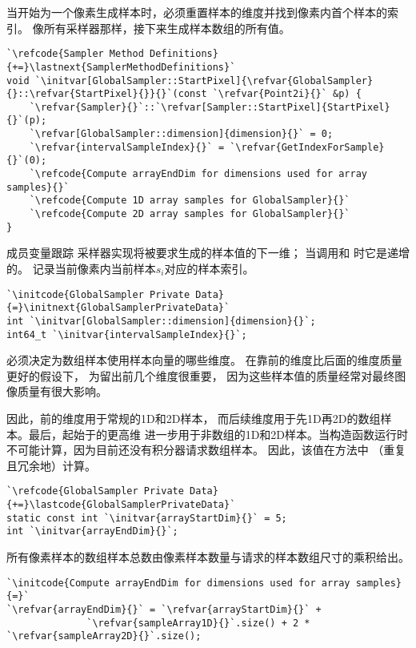当开始为一个像素生成样本时，必须重置样本的维度并找到像素内首个样本的索引。
像所有采样器那样，接下来生成样本数组的所有值。
\begin{lstlisting}
`\refcode{Sampler Method Definitions}{+=}\lastnext{SamplerMethodDefinitions}`
void `\initvar[GlobalSampler::StartPixel]{\refvar{GlobalSampler}{}::\refvar{StartPixel}{}}{}`(const `\refvar{Point2i}{}` &p) {
    `\refvar{Sampler}{}`::`\refvar[Sampler::StartPixel]{StartPixel}{}`(p);
    `\refvar[GlobalSampler::dimension]{dimension}{}` = 0;
    `\refvar{intervalSampleIndex}{}` = `\refvar{GetIndexForSample}{}`(0);
    `\refcode{Compute arrayEndDim for dimensions used for array samples}{}`
    `\refcode{Compute 1D array samples for GlobalSampler}{}`
    `\refcode{Compute 2D array samples for GlobalSampler}{}`
}
\end{lstlisting}

成员变量跟踪
采样器实现将被要求生成的样本值的下一维；
当调用和
时它是递增的。
记录当前像素内当前样本$s_i$对应的样本索引。
\begin{lstlisting}
`\initcode{GlobalSampler Private Data}{=}\initnext{GlobalSamplerPrivateData}`
int `\initvar[GlobalSampler::dimension]{dimension}{}`;
int64_t `\initvar{intervalSampleIndex}{}`;
\end{lstlisting}

必须决定为数组样本使用样本向量的哪些维度。
在靠前的维度比后面的维度质量更好的假设下，
为留出前几个维度很重要，
因为这些样本值的质量经常对最终图像质量有很大影响。

因此，前的维度用于常规的1D和2D样本，
而后续维度用于先1D再2D的数组样本。最后，起始于的更高维
进一步用于非数组的1D和2D样本。当构造函数运行时
不可能计算，因为目前还没有积分器请求数组样本。
因此，该值在方法中
（重复且冗余地）计算。
\begin{lstlisting}
`\refcode{GlobalSampler Private Data}{+=}\lastcode{GlobalSamplerPrivateData}`
static const int `\initvar{arrayStartDim}{}` = 5;
int `\initvar{arrayEndDim}{}`;
\end{lstlisting}

所有像素样本的数组样本总数由像素样本数量与请求的样本数组尺寸的乘积给出。
\begin{lstlisting}
`\initcode{Compute arrayEndDim for dimensions used for array samples}{=}`
`\refvar{arrayEndDim}{}` = `\refvar{arrayStartDim}{}` +
              `\refvar{sampleArray1D}{}`.size() + 2 * `\refvar{sampleArray2D}{}`.size();
\end{lstlisting}

